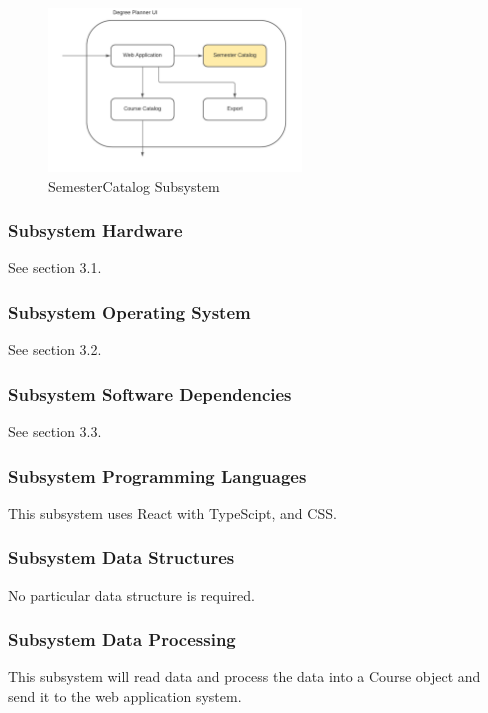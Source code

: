 \begin{figure}[h!]
	\centering
 	\includegraphics[width=0.60\textwidth]{images/SemesterCatalog} %
 \caption{SemesterCatalog Subsystem} %
\end{figure}

\subsubsection{Subsystem Hardware}
See section 3.1.

\subsubsection{Subsystem Operating System}
See section 3.2.

\subsubsection{Subsystem Software Dependencies}
See section 3.3. 

\subsubsection{Subsystem Programming Languages}
This subsystem uses React with TypeScipt, and CSS.

\subsubsection{Subsystem Data Structures}
No particular data structure is required.

\subsubsection{Subsystem Data Processing}
This subsystem will read data and process the data into a Course object and send it to the web application system.

\vspace{100cm}










